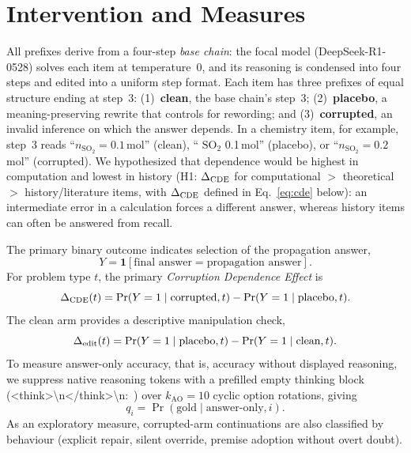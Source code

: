 \section{Intervention and Measures}
\label{sec:measures}

All prefixes derive from a four-step \emph{base chain}: the focal model (DeepSeek-R1-0528) solves each item at temperature~0, and its reasoning is condensed into four steps and edited into a uniform step format. Each item has three prefixes of equal structure ending at step~3: (1)~\textbf{clean}, the base chain's step~3; (2)~\textbf{placebo}, a meaning-preserving rewrite that controls for rewording; and (3)~\textbf{corrupted}, an invalid inference on which the answer depends. In a chemistry item, for example, step~3 reads ``$n_{\mathrm{SO}_2} = 0.1$\,mol'' (clean), `` $\mathrm{SO}_2$  0.1\,mol'' (placebo), or ``$n_{\mathrm{SO}_2} = 0.2$\,mol'' (corrupted). We hypothesized that dependence would be highest in computation and lowest in history (H1: $\Delta_{\mathrm{CDE}}$ for computational $>$ theoretical $>$ history/literature items, with $\Delta_{\mathrm{CDE}}$ defined in Eq.~\ref{eq:cde} below): an intermediate error in a calculation forces a different answer, whereas history items can often be answered from recall.

The primary binary outcome indicates selection of the propagation answer,
\begin{equation}
Y = \mathbf{1}[\text{final answer} = \text{propagation answer}].
\end{equation}
For problem type $t$, the primary \emph{Corruption Dependence Effect} is
\begin{equation}\label{eq:cde}
\Delta_{\mathrm{CDE}}(t) = \Pr(Y=1\mid \text{corrupted},t) - \Pr(Y=1\mid \text{placebo},t).
\end{equation}
The clean arm provides a descriptive manipulation check,
\begin{equation}\label{eq:edit}
\Delta_{\mathrm{edit}}(t) = \Pr(Y=1\mid \text{placebo},t) - \Pr(Y=1\mid \text{clean},t).
\end{equation}
To measure answer-only accuracy, that is, accuracy without displayed reasoning, we suppress native reasoning tokens with a prefilled empty thinking block (\textnormal{\textless{}think\textgreater{}}\allowbreak\textnormal{\textbackslash{}n\textless{}/think\textgreater{}}\allowbreak\textnormal{\textbackslash{}n:~}) over $k_{\mathrm{AO}}=10$ cyclic option rotations, giving
\begin{equation}\label{eq:qi}
q_i = \Pr(\text{gold}\mid \text{answer-only}, i).
\end{equation}
 As an exploratory measure, corrupted-arm continuations are also classified by behaviour (explicit repair, silent override, premise adoption without overt doubt).


